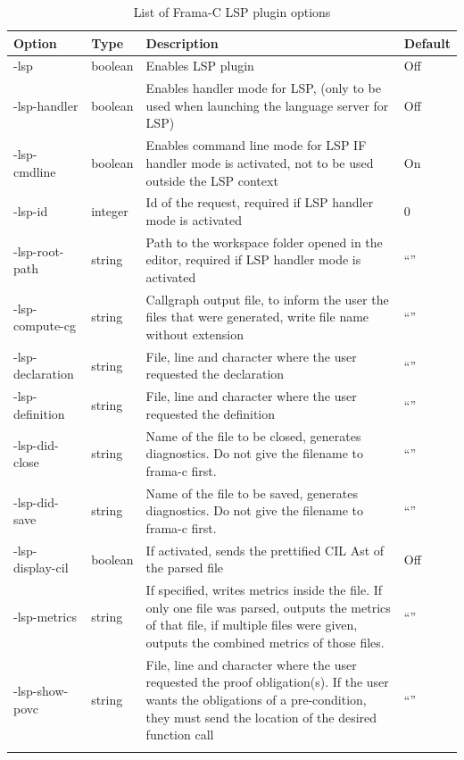\documentclass[10pt]{article}
\begin{document}
\begin{singlespace}
\begin{longtable}[H]{|p{3cm}|p{2.3cm}|p{8cm}|p{1.3cm}|}
	\hline
	\textbf{Option} &
	\textbf{Type}  & 
	\textbf{Description} &
	\textbf{Default} \\ \hline
	-lsp				& boolean		& Enables LSP plugin		& Off \\ \hline
	-lsp-handler		& boolean		& Enables handler mode for LSP, (only to be used when launching the language server for LSP)		& Off \\ \hline
	-lsp-cmdline		& boolean		& Enables command line mode for LSP IF handler mode is activated, not to be used outside the LSP context			 & On \\ \hline
	-lsp-id				& integer		& Id of the request, required if LSP handler mode is activated		& 0 \\ \hline
	-lsp-root-path		& string		& Path to the workspace folder opened in the editor, required if LSP handler mode is activated		& ``'' \\ \hline
	-lsp-compute-cg		& string		& Callgraph output file, to inform the user the files that were generated, write file name without extension		& ``'' \\ \hline
	-lsp-declaration	& string		& File, line and character where the user requested the declaration		& ``'' \\ \hline
	-lsp-definition		& string		& File, line and character where the user requested the definition		& ``'' \\ \hline
	-lsp-did-close		& string		& Name of the file to be closed, generates diagnostics. Do not give the filename to frama-c first.		& ``'' \\ \hline
	-lsp-did-save		& string		& Name of the file to be saved, generates diagnostics. Do not give the filename to frama-c first.		& ``'' \\ \hline
	-lsp-display-cil	& boolean		& If activated, sends the prettified CIL Ast of the parsed file 			 & Off \\ \hline
	-lsp-metrics		& string		& If specified, writes metrics inside the file. If only one file was parsed, outputs the metrics of that file, if multiple files were given, outputs the combined metrics of those files. 			 & ``'' \\ \hline
	-lsp-show-povc		& string		& File, line and character where the user requested the proof obligation(s). If the user wants the obligations of a pre-condition, they must send the location of the desired function call 			 & ``'' \\ \hline
	\caption{List of Frama-C LSP plugin options}
	\label{tab:lsp-options}
\end{longtable}


\end{singlespace}
\end{document}
